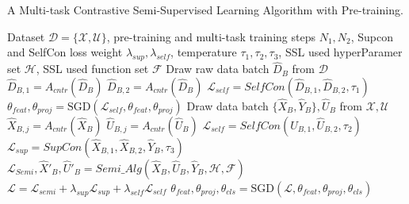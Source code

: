 \documentclass[letterpaper]{article} \usepackage{aaai22}  \usepackage{times}  \usepackage{helvet}  \usepackage{courier}  \usepackage[hyphens]{url}  \usepackage{graphicx} \usepackage{subfigure}
\begin{document}
\begin{algorithm}
\renewcommand{\algorithmicrequire}{\textbf{Input:}}
\renewcommand{\algorithmicensure}{\textbf{Output:}}
\renewcommand{\algorithmiccomment}{ \ \ \ // }
\caption{A Multi-task Contrastive Semi-Supervised Learning Algorithm with Pre-training. }
\begin{algorithmic}[1]
\REQUIRE Dataset $\mathcal{D}=\{\mathcal{X}, \mathcal{U}\}$, pre-training and multi-task training steps $N_1, N_2$, Supcon and SelfCon loss weight $\lambda_{sup}, \lambda_{self}$, temperature $\tau_1,\tau_2,\tau_3$, SSL used hyperParamer set $\mathcal{H}$, SSL used function set $\mathcal{F}$
 
    \STATE Draw raw data batch $\hat{D}_B$ from $\mathcal{D}$  
    \STATE $\hat{D}_{B,1}=A_{cntr}(\hat{D}_B)$   
    \STATE $\hat{D}_{B,2}=A_{cntr}(\hat{D}_B)$   
    \STATE $\mathcal{L}_{self}= SelfCon(\hat{D}_{B,1},\hat{D}_{B,2}, \tau_1)$
    \STATE $\theta_{feat}, \theta_{proj}=\text{SGD}(\mathcal{L}_{self}, \theta_{feat}, \theta_{proj})$
\ENDWHILE
{} 
    \STATE Draw data batch $\{\hat{X}_B, \hat{Y}_B\}, \hat{U}_B$ from $\mathcal{X}, \mathcal{U}$ 
    \STATE $\hat{X}_{B,j}=A_{cntr}(\hat{X}_B)$ 
    \STATE $\hat{U}_{B,j}=A_{cntr}(\hat{U}_B)$ 
    \ENDFOR
    \STATE $\mathcal{L}_{self}= SelfCon(\hat{U}_{B,1},\hat{U}_{B,2},\tau_2)$
    \STATE $\mathcal{L}_{sup}= SupCon(\hat{X}_{B,1},\hat{X}_{B,2}, \hat{Y}_B, \tau_3)$
    \STATE $\mathcal{L}_{Semi}, \hat{X}'_B, \hat{U}'_B = Semi\_Alg(\hat{X}_B, \hat{U}_B, \hat{Y}_B, \mathcal{H},\mathcal{F})$ 
    \STATE $\mathcal{L}= \mathcal{L}_{semi} + \lambda_{sup}\mathcal{L}_{sup} + \lambda_{self} \mathcal{L}_{self}$
    \STATE $\theta_{feat}, \theta_{proj}, \theta_{cls}=\text{SGD}(\mathcal{L}, \theta_{feat}, \theta_{proj},\theta_{cls})$
\ENDWHILE
\end{algorithmic}
\label{alg:ALG1}
\end{algorithm}
\end{document}
